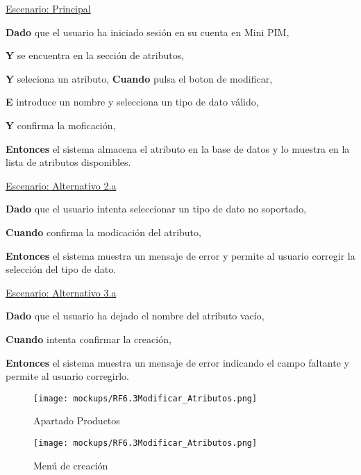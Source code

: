 \underline{Escenario: Principal}\par
\vspace{0.15cm}
\textbf{Dado} que el usuario ha iniciado sesión en su cuenta en Mini PIM,\par
\textbf{Y} se encuentra en la sección de atributos,\par
\textbf{Y} seleciona un atributo,
\textbf{Cuando} pulsa el boton de modificar,\par
\textbf{E} introduce un nombre y selecciona un tipo de dato válido,\par
\textbf{Y} confirma la moficación,\par
\textbf{Entonces} el sistema almacena el atributo en la base de datos y lo muestra en la lista de atributos disponibles.\par
\vspace{0.20cm}

\underline{Escenario: Alternativo 2.a}\par
\vspace{0.15cm}
\textbf{Dado} que el usuario intenta seleccionar un tipo de dato no soportado,\par
\textbf{Cuando} confirma la modicación del atributo,\par
\textbf{Entonces} el sistema muestra un mensaje de error y permite al usuario corregir la selección del tipo de dato.\par
\vspace{0.20cm}

\underline{Escenario: Alternativo 3.a}\par
\vspace{0.15cm}
\textbf{Dado} que el usuario ha dejado el nombre del atributo vacío,\par
\textbf{Cuando} intenta confirmar la creación,\par
\textbf{Entonces} el sistema muestra un mensaje de error indicando el campo faltante y permite al usuario corregirlo.\par
\vspace{0.20cm}


\begin{figure}[H]
    \texttt{[image: mockups/RF6.3Modificar\_Atributos.png]}
    \caption{Apartado Productos}
   \end{figure}
\vspace{1.0cm}

\begin{figure}[H]
    \texttt{[image: mockups/RF6.3Modificar\_Atributos.png]}
    \caption{Menú de creación}
   \end{figure}
\vspace{1.0cm}

\newpage %